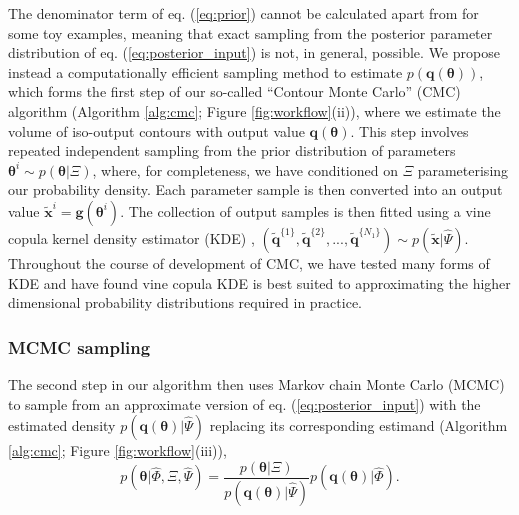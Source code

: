 The denominator term of eq. (\ref{eq:prior}) cannot be calculated apart from for some toy examples, meaning that exact sampling from the posterior parameter distribution of eq. (\ref{eq:posterior_input}) is not, in general, possible. We propose instead a computationally efficient sampling method to estimate $p(\boldsymbol{q}(\boldsymbol{\theta}))$, which forms the first step of our so-called ``Contour Monte Carlo'' (CMC) algorithm (Algorithm \ref{alg:cmc}; Figure \ref{fig:workflow}(ii)), where we estimate the volume of iso-output contours with output value $\boldsymbol{q}(\boldsymbol{\theta})$. This step involves repeated independent sampling from the prior distribution of parameters $\boldsymbol{\theta}^i\sim p(\boldsymbol{\theta}|\Xi)$, where, for completeness, we have conditioned on $\Xi$ parameterising our probability density. Each parameter sample is then converted into an output value $\tilde{\boldsymbol{x}}^i=\boldsymbol{g}(\boldsymbol{\theta}^i)$. The collection of output samples is then fitted using a vine copula kernel density estimator (KDE) \cite{nagler2016evading}, $(\tilde{\boldsymbol{q}}^{\{1\}},\tilde{\boldsymbol{q}}^{\{2\}},...,\tilde{\boldsymbol{q}}^{\{N_1\}})\sim p(\tilde{\boldsymbol{x}}|\hat{\Psi})$. Throughout the course of development of CMC, we have tested many forms of KDE and have found vine copula KDE is best suited to approximating the higher dimensional probability distributions required in practice.


\subsubsection{MCMC sampling}

The second step in our algorithm then uses Markov chain Monte Carlo (MCMC) to sample from an approximate version of eq. (\ref{eq:posterior_input}) with the estimated density $p(\boldsymbol{q}(\boldsymbol{\theta})|\hat{\Psi})$ replacing its corresponding estimand (Algorithm \ref{alg:cmc}; Figure \ref{fig:workflow}(iii)),
%
\begin{equation}\label{eq:posterior_input_estimated}
p(\boldsymbol{\theta}|\hat{\Phi},\Xi,\hat{\Psi}) = 
\frac{p(\boldsymbol{\theta}|\Xi)}{p(\boldsymbol{q}(\boldsymbol{\theta})|\hat{\Psi})} 
p(\boldsymbol{q}(\boldsymbol{\theta})|\hat{\Phi}).
\end{equation}
%

